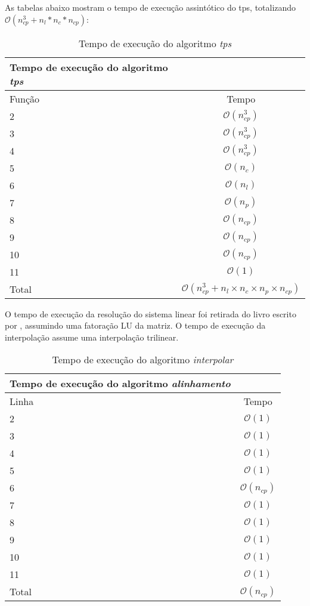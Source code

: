   As tabelas abaixo mostram o tempo de execução assintótico do tps, totalizando
$\mathcal{O}(n_{cp}^3+n_l*n_c*n_{cp})$:

\begin{table}[H]
\begin{center}
\begin{tabular}{l|c}
\hline
Tempo de execução do algoritmo \textit{tps} \\
\hline
Função & Tempo\\
\hline
2       &$\mathcal{O}(n_{cp}^3)$\\
3       &$\mathcal{O}(n_{cp}^3)$\\
4       &$\mathcal{O}(n_{cp}^3)$\\
5       &$\mathcal{O}(n_c)$\\
6       &$\mathcal{O}(n_l)$\\
7       &$\mathcal{O}(n_p)$\\
8       &$\mathcal{O}(n_{cp})$\\
9       &$\mathcal{O}(n_{cp})$\\
10       &$\mathcal{O}(n_{cp})$\\
11       &$\mathcal{O}(1)$\\
\hline
Total   &$\mathcal{O}(n_{cp}^3+n_l \times n_c \times n_p \times n_{cp})$\\
\hline
\end{tabular}
\caption{Tempo de execução do algoritmo \textit{tps}}
\label{table:tps}
\end{center}
\end{table}

  O tempo de execução da resolução do sistema linear foi retirada do livro escrito por
\cite[Part~IV]{trefethen1997numerical}, assumindo uma fatoração LU da matriz. O tempo de execução da interpolação assume uma interpolação trilinear.

\begin{table}[H]
\begin{center}
\begin{tabular}{l|c}
\hline
Tempo de execução do algoritmo \textit{alinhamento} \\
\hline
Linha&Tempo\\
\hline
2       &$\mathcal{O}(1)$ \\
3       &$\mathcal{O}(1)$ \\
4       &$\mathcal{O}(1)$\\
5       &$\mathcal{O}(1)$\\
6       &$\mathcal{O}(n_{cp})$\\
7       &$\mathcal{O}(1)$\\
8       &$\mathcal{O}(1)$\\
9       &$\mathcal{O}(1)$\\
10      &$\mathcal{O}(1)$\\
11      &$\mathcal{O}(1)$\\
\hline
Total   &$\mathcal{O}(n_{cp})$\\
\hline
\end{tabular}
\caption{Tempo de execução do algoritmo \textit{interpolar}}
\label{table:interpolar}
\end{center}
\end{table}

